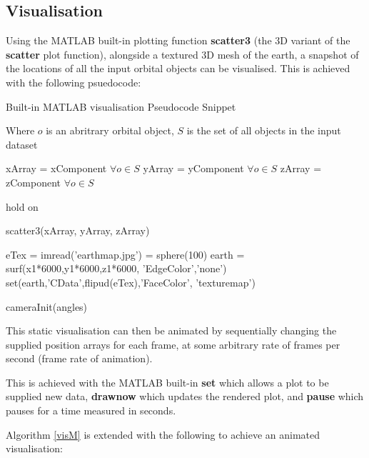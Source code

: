 \documentclass[12pt,openany,a4paper]{book}
\begin{document}
		\subsection{Visualisation}
		
		Using the MATLAB built-in plotting function \textbf{scatter3} (the 3D variant of the \textbf{scatter} plot function), alongside a textured 3D mesh of the earth, a snapshot of the locations of all the input orbital objects can be visualised. This is achieved with the following psuedocode:
				
		\begin{algorithm}[H]
			\caption{Built-in MATLAB visualisation Pseudocode Snippet}
			\label{visM}
			Where $o$ is an abritrary orbital object, $S$ is the set of all objects in the input dataset \newline
			
			xArray = xComponent $\forall o \in S$ \newline
			yArray = yComponent $\forall o \in S$ \newline
			zArray = zComponent $\forall o \in S$ \newline
			
			hold on \newline
			
			scatter3(xArray, yArray, zArray) \newline
			
			eTex = imread('earthmap.jpg') \newline
			[x1, y1, z1] = sphere(100) \newline
			earth = surf(x1*6000,y1*6000,z1*6000, 'EdgeColor','none') \newline
			set(earth,'CData',flipud(eTex),'FaceColor', 'texturemap') \newline
			
			cameraInit(angles)
		\end{algorithm}
		 
		 This static visualisation can then be animated by sequentially changing the supplied position arrays for each frame, at some arbitrary rate of frames per second (frame rate of animation). \newline
		 
		 This is achieved with the MATLAB built-in \textbf{set} which allows a plot to be supplied new data, \textbf{drawnow} which updates the rendered plot, and \textbf{pause} which pauses for a time measured in seconds. \newline
		 
		 Algorithm \ref{visM} is extended with the following to achieve an animated visualisation:
		
\end{document}
